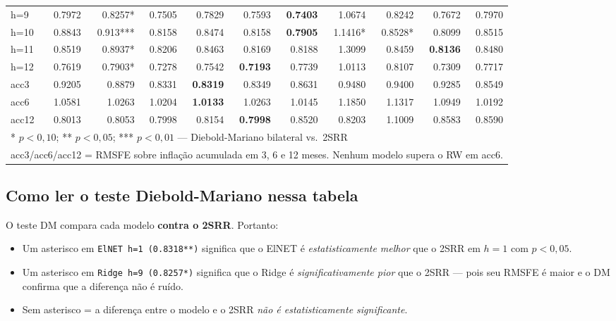 \documentclass[12pt, a4paper]{article}
\begin{document}
\begin{table}[H]
{\begin{tabular}{lrrrrrrrrrr}
h=9  & 0.7972 & 0.8257* & 0.7505  & 0.7829   & 0.7593   & \textbf{0.7403} & 1.0674 & 0.8242 & 0.7672 & 0.7970 \\
h=10 & 0.8843 & 0.913*** & 0.8158 & 0.8474   & 0.8158   & \textbf{0.7905} & 1.1416* & 0.8528* & 0.8099 & 0.8515 \\
h=11 & 0.8519 & 0.8937* & 0.8206  & 0.8463   & 0.8169   & 0.8188 & 1.3099  & 0.8459 & \textbf{0.8136} & 0.8480 \\
h=12 & 0.7619 & 0.7903* & 0.7278  & 0.7542   & \textbf{0.7193}   & 0.7739 & 1.0113 & 0.8107 & 0.7309 & 0.7717 \\
\hline
acc3  & 0.9205 & 0.8879 & 0.8331 & \textbf{0.8319} & 0.8349 & 0.8631 & 0.9480 & 0.9400 & 0.9285 & 0.8549 \\
acc6  & 1.0581 & 1.0263 & 1.0204 & \textbf{1.0133} & 1.0263 & 1.0145 & 1.1850 & 1.1317 & 1.0949 & 1.0192 \\
acc12 & 0.8013 & 0.8053 & 0.7998 & 0.8154   & \textbf{0.7998} & 0.8520 & 0.8203 & 1.1009 & 0.8583 & 0.8590 \\
\hline
\multicolumn{11}{l}{\scriptsize{* $p<0{,}10$; ** $p<0{,}05$; *** $p<0{,}01$ --- Diebold-Mariano bilateral vs.\ 2SRR}}\\
\multicolumn{11}{l}{\scriptsize{acc3/acc6/acc12 = RMSFE sobre inflação acumulada em 3, 6 e 12 meses. Nenhum modelo supera o RW em acc6.}}\\
\end{tabular}
}
\end{table}

\subsection{Como ler o teste Diebold-Mariano nessa tabela}

O teste DM compara cada modelo \textbf{contra o 2SRR}. Portanto:

\begin{itemize}
  \item Um asterisco em \texttt{ElNET h=1 (0.8318**)} significa que
    o ElNET é \emph{estatisticamente melhor} que o 2SRR em $h=1$
    com $p < 0{,}05$.
  \item Um asterisco em \texttt{Ridge h=9 (0.8257*)} significa que o
    Ridge é \emph{significativamente pior} que o 2SRR --- pois seu
    RMSFE é maior e o DM confirma que a diferença não é ruído.
  \item Sem asterisco = a diferença entre o modelo e o 2SRR
    \emph{não é estatisticamente significante}.
\end{itemize}
\end{document}

